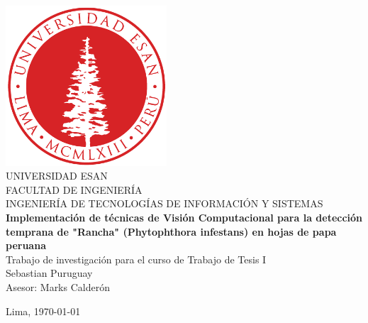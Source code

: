 \documentclass[12pt]{report}
\numberwithin{equation}{chapter} %
\begin{document}
\begin{titlepage}

	\begin{center}
	    \includegraphics[width=0.45\textwidth]{images_repo/esanlogomin}
		\vspace*{2cm} \\
		UNIVERSIDAD ESAN \vspace*{1ex} \\
		FACULTAD DE INGENIERÍA \vspace*{1ex} \\
		INGENIERÍA DE TECNOLOGÍAS DE INFORMACIÓN Y SISTEMAS\vspace*{8ex} \\
		\textbf{Implementación de técnicas de Visión Computacional para la detección temprana de "Rancha" (Phytophthora infestans) en hojas de papa peruana}
		\vspace*{8ex}\\	
		Trabajo de investigación para el curso de Trabajo de Tesis I 
		\vspace*{8ex} \\	
		Sebastian Puruguay \\
		Asesor: Marks Calderón		
		\vfill
		
		Lima, \today 
		
	\end{center}
\end{titlepage}
\renewcommand{\listfigurename}{Índice de Figuras}
\renewcommand{\tablename}{Tabla}
\renewcommand{\listtablename}{Índice de Tablas}


\tableofcontents            %

\end{document}
